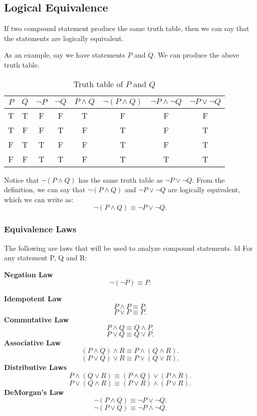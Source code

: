 \documentclass[a4paper]{article}
\begin{document}
\subsection{Logical Equivalence}
\begin{tcolorbox}[title= Definition]
	If two compound statement produce the same truth table, then we can say that the statements are logically equivalent.
\end{tcolorbox}
As an example, say we have statements $P$ and $Q$. We can produce the above truth table.
\begin{table}[htpb]
	\centering
	\caption{Truth table of $P$ and  $Q$}
	\vspace{15pt}	
	\label{tab:equivalenceex}
	\begin{tabular}{c|c|c|c|c|c|c|c}
		$P$ &  $Q$ &  $\neg P$ & $\neg Q$ &  $P \wedge Q$ & $\neg \left( P \wedge Q \right)$ & $\neg P \wedge \neg Q$ &  $\neg P \vee \neg Q$ \\ \hline 
		T & T & F & F & T & F & F & F \\
		T&F&F&T&F&T&F&T \\
		F&T&T&F&F&T&F&T \\
		F&F&T&T&F&T&T&T \\
	\end{tabular}
\end{table}


Notice that $\neg\left( P \wedge Q \right) $ has the same truth table as $\neg P \vee \neg Q$. From the definition, we can say that  $\neg \left( P \wedge Q \right) $ and $\neg P \vee \neg Q$ are logically equivalent, which we can write as: \[
\neg \left( P \wedge Q \right)  \equiv \neg P \vee \neg Q.\] 

\subsubsection{Equivalence Laws}
The following are laws that will be used to analyze compound statements. 
ld
For any statement P, Q and R:

\begin{tcolorbox}[breakable, title=Definition]
	\textbf{Negation Law}\[
		\neg\left( \neg P \right) \equiv P 
	.\]

	\textbf{Idempotent Law}\[
		P \wedge P \equiv P
		.\] \[
		P \vee P \equiv P
	.\] 
	\textbf{Commutative Law}\[
		P \wedge Q \equiv Q \wedge P
		.\] \[
		P \vee Q \equiv Q \vee P
	.\] 
	\textbf{Associative Law}\[
		\left( P \wedge Q \right) \wedge R \equiv P \wedge \left( Q \wedge R \right)  
		.\] \[
		\left( P \vee Q \right) \vee R \equiv P \vee \left( Q \vee R \right)  
	.\] 
	\textbf{Distributive Laws}\[
		P \wedge \left( Q \vee R \right) \equiv \left( P \wedge Q \right) \vee \left( P \wedge R \right)   
		.\] \[
		P \vee \left( Q \wedge R \right) \equiv \left( P \vee R \right) \wedge \left( P \vee R \right)  
	.\]
	\textbf{DeMorgan's Law}\[
		\neg \left( P \wedge Q \right) \equiv \neg P \vee \neg Q
		.\] \[
		\neg\left( P \vee Q \right) \equiv \neg P \wedge \neg Q 
	.\] 
\end{tcolorbox}
\vspace{15pt}
\end{document}
